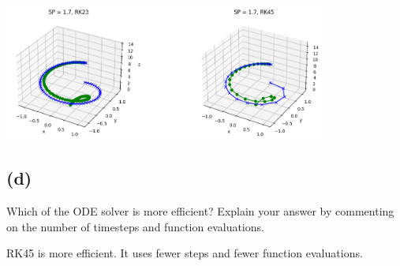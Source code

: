 \documentclass[11pt]{article}
\begin{document}
\includegraphics[width=300pt]{a2q6_4.png}

\subsection{(d)}

Which of the ODE solver is more efficient? Explain your answer by commenting on the number of timesteps and function evaluations.

RK45 is more efficient. It uses fewer steps and fewer function evaluations.
\end{document}
